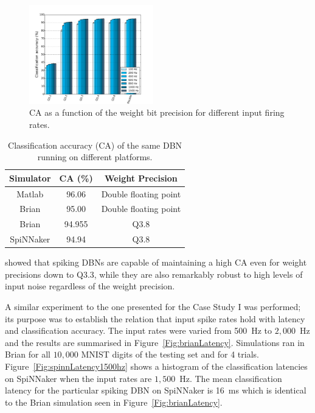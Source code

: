 \documentclass{frontiersENG} %
\begin{document}
\begin{figure}[hbt!]
	\centering
	\includegraphics[width=0.48\textwidth]{cavsfiringrate}
	\caption{CA as a function of the weight bit precision for different input firing rates.}
	\label{Fig:brianCAfiringrate}
\end{figure} 


\begin{table}[h]
	\caption{Classification accuracy (CA) of the same DBN running on different platforms.}
	\begin{center}
		\begin{tabular} {c|c|c}
			Simulator & CA (\%) & Weight Precision \\
			\hline
			Matlab & 96.06 & Double floating point\\
			Brian & 95.00 & Double floating point\\
			Brian & 94.955 & Q3.8\\
			SpiNNaker & 94.94 & Q3.8\\
		\end{tabular}
		\label{tab:casimulators}
	\end{center}
\end{table}

\citet{stromatias2015robustness} showed that spiking DBNs are capable of maintaining a high CA even for weight precisions down to Q3.3, while they are also remarkably robust to high levels of input noise regardless of the weight precision. 

A similar experiment to the one presented for the Case Study I was performed; its purpose was to establish the relation that input spike rates hold with latency and classification accuracy.
The input rates were varied from 500~Hz to $2,000$~Hz and the results are summarised in Figure~\ref{Fig:brianLatency}. Simulations ran in Brian for all $10,000$ MNIST digits of the testing set and for 4 trials. Figure~\ref{Fig:spinnLatency1500hz} shows a histogram of the classification latencies on SpiNNaker when the input rates are $1,500$~Hz. The mean classification latency for the particular spiking DBN on SpiNNaker is 16~ms which is identical to the Brian simulation seen in Figure~\ref{Fig:brianLatency}.
\end{document}

